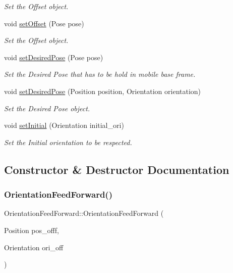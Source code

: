 \begin{DoxyCompactItemize}
\begin{DoxyCompactList}\small\item\em Set the Offset object. \end{DoxyCompactList}\item 
void \hyperlink{classOrientationFeedForward_adbd1691b1e930752818624d065acbf1c}{set\+Offset} (Pose pose)
\begin{DoxyCompactList}\small\item\em Set the Offset object. \end{DoxyCompactList}\item 
void \hyperlink{classOrientationFeedForward_a5f69dfd449972707d2ccd07e20fd2c5b}{set\+Desired\+Pose} (Pose pose)
\begin{DoxyCompactList}\small\item\em Set the Desired Pose that has to be hold in mobile base frame. \end{DoxyCompactList}\item 
void \hyperlink{classOrientationFeedForward_ad419aebf0df88282ca6c1dc24adbadb2}{set\+Desired\+Pose} (Position position, Orientation orientation)
\begin{DoxyCompactList}\small\item\em Set the Desired Pose object. \end{DoxyCompactList}\item 
void \hyperlink{classOrientationFeedForward_a28382586a5d371fa6efbdf08f5e57518}{set\+Initial} (Orientation initial\+\_\+ori)
\begin{DoxyCompactList}\small\item\em Set the Initial orientation to be respected. \end{DoxyCompactList}\end{DoxyCompactItemize}


\subsection{Constructor \& Destructor Documentation}
\mbox{\label{classOrientationFeedForward_a0ae1aba3b3e0abf84828a9db008b6f69}} 
\subsubsection{\texorpdfstring{Orientation\+Feed\+Forward()}{OrientationFeedForward()}}
{\footnotesize\ttfamily Orientation\+Feed\+Forward\+::\+Orientation\+Feed\+Forward (\begin{DoxyParamCaption}\item[{Position}]{pos\+\_\+offf,  }\item[{Orientation}]{ori\+\_\+off }\end{DoxyParamCaption})}


